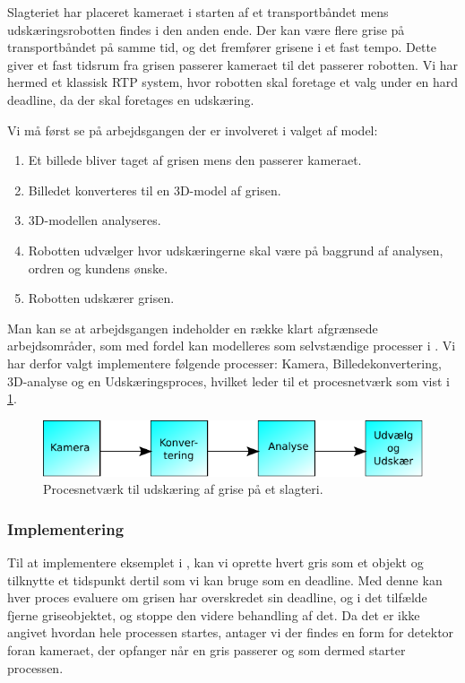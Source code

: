 Slagteriet har placeret kameraet i starten af et transportbåndet mens udskæringsrobotten findes i den anden ende. Der kan være flere grise på transportbåndet på samme tid, og det fremfører grisene i et fast tempo. Dette giver et fast tidsrum fra grisen passerer kameraet til det passerer robotten. Vi har hermed et klassisk RTP system, hvor robotten skal foretage et valg under en hard deadline, da der skal foretages en udskæring.

Vi må først se på arbejdsgangen der er involveret i valget af model:
\begin{enumerate}
\tightlist
	\item Et billede bliver taget af grisen mens den passerer kameraet.
	\item Billedet konverteres til en 3D-model af grisen.
	\item 3D-modellen analyseres.
	\item Robotten udvælger hvor udskæringerne skal være på baggrund af analysen, ordren og kundens ønske.
	\item Robotten udskærer grisen.
\end{enumerate}

Man kan se at arbejdsgangen indeholder en  række klart afgrænsede arbejdsområder, som med fordel kan modelleres som selvstændige processer i \pycsp.  Vi har derfor valgt implementere følgende processer: Kamera, Billedekonvertering, 3D-analyse og en Udskæringsproces, hvilket leder til et procesnetværk som vist i \cref{fig:pig-network}.

\begin{figure}
 \begin{center}
  \includegraphics[scale=1]{images/pig-network}
	\caption{Procesnetværk til udskæring af grise på et slagteri.}
	\label{fig:pig-network}
\end{center}
\end{figure}

\subsubsection*{Implementering}\label{sec:deadline-exampel-implementation}
Til at implementere eksemplet i \pycsp, kan vi oprette hvert gris som et objekt og tilknytte et tidspunkt dertil som vi kan bruge som en deadline. Med denne kan hver proces evaluere om grisen har overskredet sin deadline, og i det tilfælde fjerne griseobjektet, og stoppe den videre behandling af det. Da det er ikke angivet hvordan hele processen startes,  antager vi der findes en form for detektor foran kameraet, der opfanger når en gris passerer og som dermed starter processen. 

